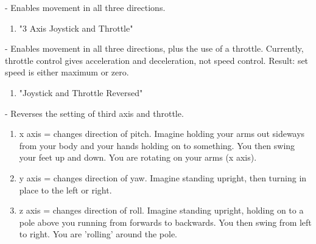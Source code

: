 \documentclass{article}
\begin{document}
 - Enables movement in all three directions. 

\begin{enumerate}
\item  "3 Axis Joystick and Throttle" 
\end{enumerate}

 - Enables movement in all three directions, plus the use of a throttle. Currently, throttle control  gives acceleration and deceleration, not speed control. Result: set speed is either maximum or zero. 

\begin{enumerate}
\item  "Joystick and Throttle Reversed" 
\end{enumerate}

 - Reverses the setting of third axis and throttle. 






\begin{enumerate}
\item  x axis = changes direction of pitch. Imagine holding your arms out sideways from your body and your hands holding on to something. You then swing your feet up and down. You are rotating on your arms (x axis). 

\item  y axis = changes direction of yaw. Imagine standing upright, then turning in place to the left or right.  

\item  z axis = changes direction of roll. Imagine standing upright, holding on to a pole above you running from forwards to backwards. You then swing from left to right. You are 'rolling' around the pole.
\end{enumerate}
\end{document}
